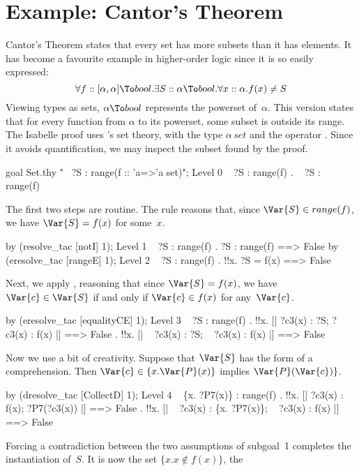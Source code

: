 \section{Example: Cantor's Theorem}
Cantor's Theorem states that every set has more subsets than it has
elements.  It has become a favourite example in higher-order logic since
it is so easily expressed:
\[  \forall f::[\alpha,\alpha]\To bool. \exists S::\alpha\To bool.
    \forall x::\alpha. f(x) \not= S 
\] 
Viewing types as sets, $\alpha\To bool$ represents the powerset
of~$\alpha$.  This version states that for every function from $\alpha$ to
its powerset, some subset is outside its range.
The Isabelle proof uses \HOL's set theory, with the type $\alpha\,set$ and
the operator .  Since it avoids quantification, we may
inspect the subset found by the proof.
\begin{ttbox}
goal Set.thy "~ ?S : range(f :: 'a=>'a set)";
{\out Level 0}
{\out ~ ?S : range(f)}
{. ~ ?S : range(f)}
\end{ttbox}
The first two steps are routine.  The rule  reasons that,
since $\Var{S}\in range(f)$, we have $\Var{S}=f(x)$ for some~$x$.
\begin{ttbox}
by (resolve_tac [notI] 1);
{\out Level 1}
{\out ~ ?S : range(f)}
{. ?S : range(f) ==> False}
\ttbreak
by (eresolve_tac [rangeE] 1);
{\out Level 2}
{\out ~ ?S : range(f)}
{. !!x. ?S = f(x) ==> False}
\end{ttbox}
Next, we apply , reasoning that since $\Var{S}=f(x)$,
we have $\Var{c}\in \Var{S}$ if and only if $\Var{c}\in f(x)$ for
any~$\Var{c}$.
\begin{ttbox}
by (eresolve_tac [equalityCE] 1);
{\out Level 3}
{\out ~ ?S : range(f)}
{. !!x. [| ?c3(x) : ?S; ?c3(x) : f(x) |] ==> False}
{. !!x. [| ~ ?c3(x) : ?S; ~ ?c3(x) : f(x) |] ==> False}
\end{ttbox}
Now we use a bit of creativity.  Suppose that $\Var{S}$ has the form of a
comprehension.  Then $\Var{c}\in\{x.\Var{P}(x)\}$ implies
$\Var{P}(\Var{c})\}$.
\begin{ttbox}
by (dresolve_tac [CollectD] 1);
{\out Level 4}
{\out ~ \{x. ?P7(x)\} : range(f)}
{. !!x. [| ?c3(x) : f(x); ?P7(?c3(x)) |] ==> False}
{. !!x. [| ~ ?c3(x) : \{x. ?P7(x)\}; ~ ?c3(x) : f(x) |] ==> False}
\end{ttbox}
Forcing a contradiction between the two assumptions of subgoal~1 completes
the instantiation of~$S$.  It is now the set $\{x. x\not\in f(x)\}$, the
